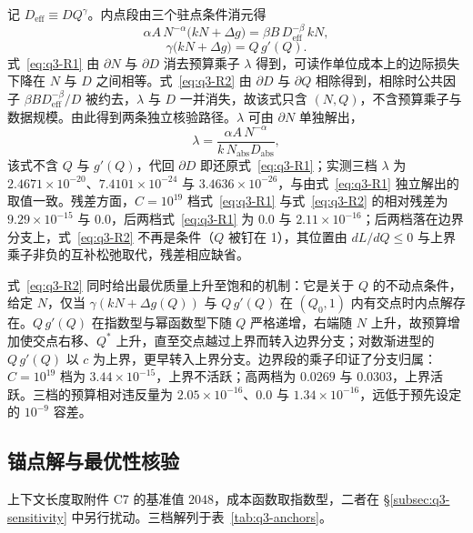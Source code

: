 记 $D_{\text{eff}}\equiv DQ^{\gamma}$。内点段由三个驻点条件消元得
\begin{equation}
  \alpha A\,N^{-\alpha}\bigl(k N+\Delta g\bigr)=\beta B\,D_{\text{eff}}^{-\beta}\,k N,
  \label{eq:q3-R1}
\end{equation}
\begin{equation}
  \gamma\bigl(k N+\Delta g\bigr)=Q\,g'(Q).
  \label{eq:q3-R2}
\end{equation}
式~\eqref{eq:q3-R1} 由 $\partial N$ 与 $\partial D$ 消去预算乘子 $\lambda$ 得到，可读作单位成本上的边际损失下降在 $N$ 与 $D$ 之间相等。式~\eqref{eq:q3-R2} 由 $\partial D$ 与 $\partial Q$ 相除得到，相除时公共因子 $\beta B D_{\text{eff}}^{-\beta}/D$ 被约去，$\lambda$ 与 $D$ 一并消失，故该式只含 $(N,Q)$，不含预算乘子与数据规模。由此得到两条独立核验路径。$\lambda$ 可由 $\partial N$ 单独解出，
\begin{equation}
  \lambda=\frac{\alpha A\,N^{-\alpha}}{k\,N_{\text{abs}}D_{\text{abs}}},
  \label{eq:q3-lambda}
\end{equation}
该式不含 $Q$ 与 $g'(Q)$，代回 $\partial D$ 即还原式~\eqref{eq:q3-R1}；实测三档 $\lambda$ 为 $2.4671\times10^{-20}$、$7.4101\times10^{-24}$ 与 $3.4636\times10^{-26}$，与由式~\eqref{eq:q3-R1} 独立解出的取值一致。残差方面，$C=10^{19}$ 档式~\eqref{eq:q3-R1} 与式~\eqref{eq:q3-R2} 的相对残差为 $9.29\times10^{-15}$ 与 $0.0$，后两档式~\eqref{eq:q3-R1} 为 $0.0$ 与 $2.11\times10^{-16}$；后两档落在边界分支上，式~\eqref{eq:q3-R2} 不再是条件（$Q$ 被钉在 1），其位置由 $dL/dQ\le0$ 与上界乘子非负的互补松弛取代，残差相应缺省。

式~\eqref{eq:q3-R2} 同时给出最优质量上升至饱和的机制：它是关于 $Q$ 的不动点条件，给定 $N$，仅当 $\gamma(kN+\Delta g(Q))$ 与 $Q\,g'(Q)$ 在 $(Q_0,1)$ 内有交点时内点解存在。$Q\,g'(Q)$ 在指数型与幂函数型下随 $Q$ 严格递增，右端随 $N$ 上升，故预算增加使交点右移、$Q^{*}$ 上升，直至交点越过上界而转入边界分支；对数渐进型的 $Q\,g'(Q)$ 以 $c$ 为上界，更早转入上界分支。边界段的乘子印证了分支归属：$C=10^{19}$ 档为 $3.44\times10^{-15}$，上界不活跃；高两档为 $0.0269$ 与 $0.0303$，上界活跃。三档的预算相对违反量为 $2.05\times10^{-16}$、$0.0$ 与 $1.34\times10^{-16}$，远低于预先设定的 $10^{-9}$ 容差。

\subsection{锚点解与最优性核验}
\label{subsec:q3-anchors}

上下文长度取附件 C7 的基准值 $2048$，成本函数取指数型，二者在 \S\ref{subsec:q3-sensitivity} 中另行扰动。三档解列于表~\ref{tab:q3-anchors}。

